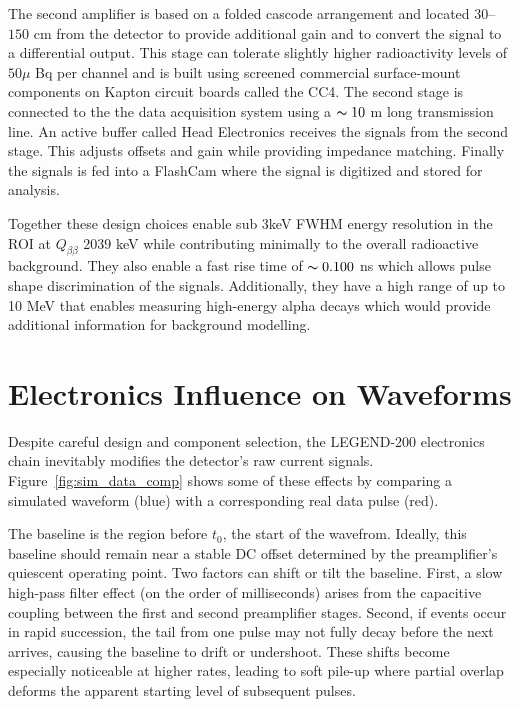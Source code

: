 The second amplifier is based on a folded cascode arrangement and located $30$–$150$ cm from the detector to provide additional gain and to convert the signal to a differential output. This stage can tolerate slightly higher radioactivity levels of $50\mu$ Bq per channel and is built using screened commercial surface-mount components on Kapton circuit boards called the CC4. The second stage is connected to the the data acquisition system using a $\thicksim 10$ m long transmission line. An active buffer called Head Electronics receives the signals from the second stage. This adjusts offsets and gain while providing impedance matching. Finally the signals is fed into a FlashCam where the signal is digitized and stored for analysis.

Together these design choices enable sub 3keV FWHM energy resolution in the ROI at $Q_{\beta\beta}$ 2039 keV while contributing minimally to the overall radioactive background. They also enable a fast rise time of $\thicksim 0.100$ ns which allows pulse shape discrimination of the signals. Additionally, they have a high range of up to 10 MeV that enables measuring high-energy alpha decays which would provide additional information for background modelling.

\section{Electronics Influence on Waveforms}

Despite careful design and component selection, the LEGEND-200 electronics chain inevitably modifies the detector’s raw current signals. Figure~\ref{fig:sim_data_comp} shows some of these effects by comparing a simulated waveform (blue) with a corresponding real data pulse (red).

The baseline is the region before $t_0$, the start of the wavefrom. Ideally, this baseline should remain near a stable DC offset determined by the preamplifier’s quiescent operating point. Two factors can shift or tilt the baseline. First, a slow high-pass filter effect (on the order of milliseconds) arises from the capacitive coupling between the first and second preamplifier stages. Second, if events occur in rapid succession, the tail from one pulse may not fully decay before the next arrives, causing the baseline to drift or undershoot. These shifts become especially noticeable at higher rates, leading to soft pile-up where partial overlap deforms the apparent starting level of subsequent pulses. 

